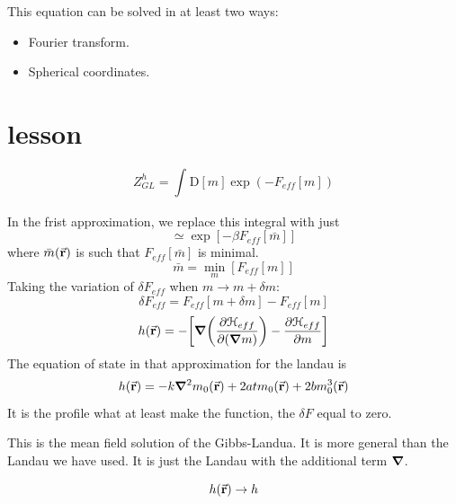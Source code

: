 \documentclass[../main/main.tex]{subfiles}
\begin{document}
This equation can be solved in at least two ways:
\begin{itemize}
\item Fourier transform.
\item Spherical coordinates.
\end{itemize}

\section{lesson}



\begin{equation}
Z_{GL}^h = \int_{}^{} \text{D}[m] \exp (-F_{eff}[m])
\end{equation}

In the frist approximation, we replace this integral with just
\begin{equation}
  \simeq \exp [-\beta F_{eff} [\bar{m} ] ]
\end{equation}
where \( \bar{m}(\va{r})  \) is such that \( F_{eff} [\bar{m} ] \) is minimal.
\begin{equation}
  \bar{m} =  \min_{m} [F_{eff}[m]]
\end{equation}
Taking the variation of \( \delta F_{eff} \) when \( m \rightarrow m + \delta m \):
\begin{equation}
  \delta F_{eff} = F_{eff} [m+\delta m] - F_{eff} [m]
\end{equation}
\begin{equation}
  h (\va{r}) = - \qty[\grad \qty(\pdv{ \mathcal{H}_{eff}}{(\grad m)} ) - \pdv{\mathcal{H}_{eff}}{m}  ]
\end{equation}
The equation of state in that approximation for the landau is
\begin{equation}
  h (\va{r}) = - k \grad ^2 m_0(\va{r}) + 2 a t m_0 (\va{r})+ 2 b m_0^3(\va{r})
  \label{eq:17_1}
\end{equation}
It is the profile what at least make the function, the \( \delta F \) equal to zero.

This is the mean field solution of the Gibbs-Landua. It is more general than the Landau we have used. It is just the Landau with the additional term \( \grad  \).

\begin{equation}
  h(\va{r}) \rightarrow h
\end{equation}
\end{document}
